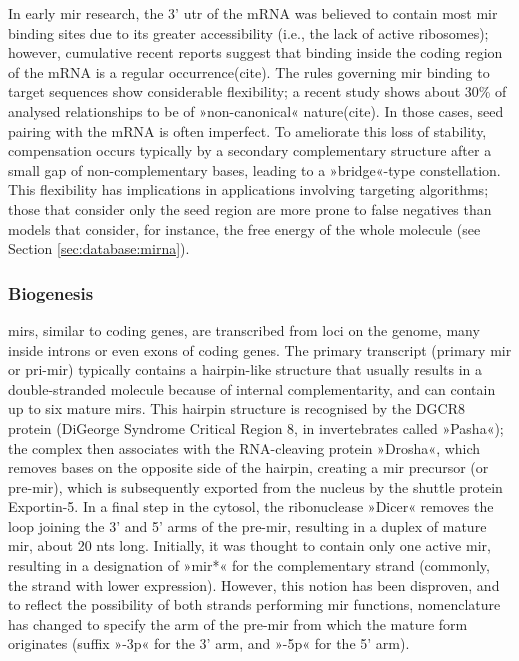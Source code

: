 In early \ac{mir} research, the 3' \ac{utr} of the mRNA was believed to contain most \ac{mir} binding sites due to its greater accessibility (i.e., the lack of active ribosomes); however, cumulative recent reports suggest that binding inside the coding region of the mRNA is a regular occurrence(cite). The rules governing \ac{mir} binding to target sequences show considerable flexibility; a recent study shows about 30\% of analysed relationships to be of »non-canonical« nature(cite). In those cases, seed pairing with the mRNA is often imperfect. To ameliorate this loss of stability, compensation occurs typically by a secondary complementary structure after a small gap of non-complementary bases, leading to a »bridge«-type constellation.  This flexibility has implications in applications involving targeting algorithms; those that consider only the seed region are more prone to false negatives than models that consider, for instance, the free energy of the whole molecule (see Section \ref{sec:database:mirna}).

\subsubsection{Biogenesis}
\acp{mir}, similar to coding genes, are transcribed from loci on the genome, many inside introns or even exons of coding genes.\cite{Rodriguez2004} The primary transcript (primary \ac{mir} or pri-\ac{mir}) typically contains a hairpin-like structure that usually results in a double-stranded molecule because of internal complementarity, and can contain up to six mature \acp{mir}. This hairpin structure is recognised by the DGCR8 protein (DiGeorge Syndrome Critical Region 8, in invertebrates called »Pasha«); the complex then associates with the RNA-cleaving protein »Drosha«, which removes bases on the opposite side of the hairpin, creating a \ac{mir} precursor (or pre-\ac{mir}), which is subsequently exported from the nucleus by the shuttle protein Exportin-5. In a final step in the cytosol, the ribonuclease »Dicer« removes the loop joining the 3' and 5' arms of the pre-\ac{mir}, resulting in a duplex of mature \ac{mir}, about 20 \acp{nt} long. Initially, it was thought to contain only one active \ac{mir}, resulting in a designation of »\ac{mir}*« for the complementary strand (commonly, the strand with lower expression). However, this notion has been disproven, and to reflect the possibility of both strands performing \ac{mir} functions, nomenclature has changed to specify the arm of the pre-\ac{mir} from which the mature form originates (suffix »-3p« for the 3' arm, and »-5p« for the 5' arm).

